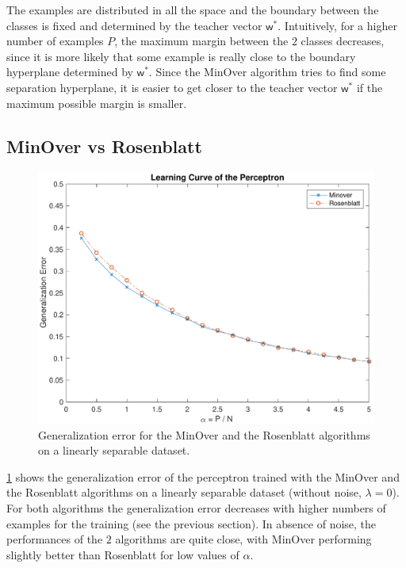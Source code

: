 The examples are distributed in all the space and the boundary between the classes is fixed and determined by the teacher vector $\bm{\mathsf{w}}^{*}$.
Intuitively, for a higher number of examples $P$, the maximum margin between the $2$ classes decreases, since it is more likely that some example is really close to the boundary hyperplane determined by $\bm{\mathsf{w}}^{*}$.
Since the MinOver algorithm tries to find some separation hyperplane, it is easier to get closer to the teacher vector $\bm{\mathsf{w}}^{*}$ if the maximum possible margin is smaller.


\subsection{MinOver vs Rosenblatt}
\begin{figure}[t]
	\centering
	\includegraphics[width=\columnwidth]{figures/comparison}
    \caption{Generalization error for the MinOver and the Rosenblatt algorithms on a linearly separable dataset.}
	\label{fig:comparison}
\end{figure}

\cref{fig:comparison} shows the generalization error of the perceptron trained with the MinOver and the Rosenblatt algorithms on a linearly separable dataset (without noise, $\lambda = 0$).
For both algorithms the generalization error decreases with higher numbers of examples for the training (see the previous section).
In absence of noise, the performances of the $2$ algorithms are quite close, with MinOver performing slightly better than Rosenblatt for low values of $\alpha$.


